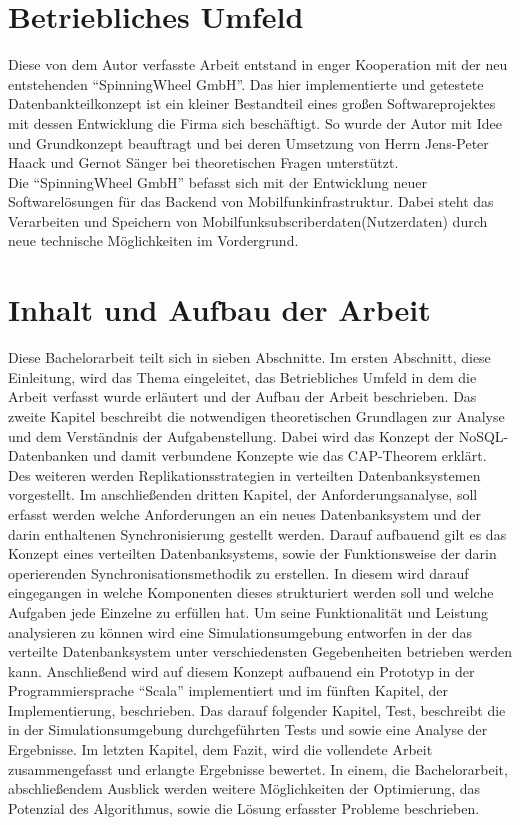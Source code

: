 \documentclass[a4paper,11pt,oneside,%
headsepline,												%
footsepline,												%
bibtotocnumbered									%
]{scrreprt}
\begin{document}
\section{Betriebliches Umfeld}
Diese von dem Autor verfasste Arbeit entstand in enger Kooperation mit der neu entstehenden \enquote{SpinningWheel GmbH}. Das hier implementierte und getestete Datenbankteilkonzept ist ein kleiner Bestandteil eines großen Softwareprojektes mit dessen Entwicklung die Firma sich beschäftigt. So wurde der Autor mit Idee und Grundkonzept beauftragt und bei deren Umsetzung von Herrn Jens-Peter Haack und Gernot Sänger bei theoretischen Fragen unterstützt.\\

Die \enquote{SpinningWheel GmbH} befasst sich mit der Entwicklung neuer Softwarelösungen für das Backend von Mobilfunkinfrastruktur. Dabei steht das Verarbeiten und Speichern von Mobilfunksubscriberdaten(Nutzerdaten) durch neue technische Möglichkeiten im Vordergrund.

\section{Inhalt und Aufbau der Arbeit}
Diese Bachelorarbeit teilt sich in sieben Abschnitte. Im ersten Abschnitt, diese Einleitung, wird das Thema eingeleitet, das Betriebliches Umfeld in dem die Arbeit verfasst wurde erläutert und der Aufbau der Arbeit beschrieben. Das zweite Kapitel beschreibt die notwendigen theoretischen Grundlagen zur Analyse und dem Verständnis der Aufgabenstellung. Dabei wird das Konzept der NoSQL-Datenbanken und damit verbundene Konzepte wie das CAP-Theorem erklärt. Des weiteren werden Replikationsstrategien in verteilten Datenbanksystemen vorgestellt. Im anschließenden dritten Kapitel, der Anforderungsanalyse, soll erfasst werden welche Anforderungen an ein neues Datenbanksystem und der darin enthaltenen Synchronisierung gestellt werden. Darauf aufbauend gilt es das Konzept eines verteilten Datenbanksystems, sowie der Funktionsweise der darin operierenden Synchronisationsmethodik zu erstellen. In diesem wird darauf eingegangen in welche Komponenten dieses strukturiert werden soll und welche Aufgaben jede Einzelne zu erfüllen hat. Um seine Funktionalität und Leistung analysieren zu können wird eine Simulationsumgebung entworfen in der das verteilte Datenbanksystem unter verschiedensten Gegebenheiten betrieben werden kann. Anschließend wird auf diesem Konzept aufbauend ein Prototyp in der Programmiersprache \enquote{Scala} implementiert und im fünften Kapitel, der Implementierung, beschrieben. Das darauf folgender Kapitel, Test, beschreibt die in der Simulationsumgebung durchgeführten Tests und sowie eine Analyse der Ergebnisse. Im letzten Kapitel, dem Fazit, wird die vollendete Arbeit zusammengefasst und erlangte Ergebnisse bewertet. In einem, die Bachelorarbeit, abschließendem Ausblick werden weitere Möglichkeiten der Optimierung, das Potenzial des Algorithmus, sowie die Lösung erfasster Probleme beschrieben.	%
\end{document}
